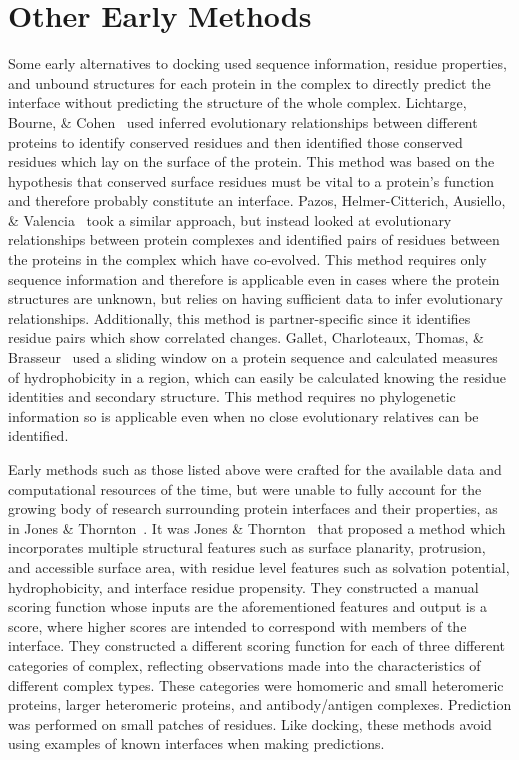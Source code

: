 \section{Other Early Methods}

Some early alternatives to docking used sequence information, residue properties, and unbound structures for each protein in the complex to directly predict the interface without predicting the structure of the whole complex.
Lichtarge, Bourne, \& Cohen~\cite{lichtarge1996} used inferred evolutionary relationships between different proteins to identify conserved residues and then identified those conserved residues which lay on the surface of the protein.
This method was based on the hypothesis that conserved surface residues must be vital to a protein's function and therefore probably constitute an interface.
Pazos, Helmer-Citterich, Ausiello, \& Valencia~\cite{pazos1997} took a similar approach, but instead looked at evolutionary relationships between protein complexes and identified pairs of residues between the proteins in the complex which have co-evolved.
This method requires only sequence information and therefore is applicable even in cases where the protein structures are unknown, but relies on having sufficient data to infer evolutionary relationships.
Additionally, this method is partner-specific since it identifies residue pairs which show correlated changes.
Gallet, Charloteaux, Thomas, \& Brasseur~\cite{gallet2000} used a sliding window on a protein sequence and calculated measures of hydrophobicity in a region, which can easily be calculated knowing the residue identities and secondary structure.
This method requires no phylogenetic information so is applicable even when no close evolutionary relatives can be identified.

Early methods such as those listed above were crafted for the available data and computational resources of the time, but were unable to fully account for the growing body of research surrounding protein interfaces and their properties, as in Jones \& Thornton~\cite{jones1996}.
It was Jones \& Thornton~\cite{jones1997} that proposed a method which incorporates multiple structural features such as surface planarity, protrusion, and accessible surface area, with residue level features such as solvation potential, hydrophobicity, and interface residue propensity.
They constructed a manual scoring function whose inputs are the aforementioned features and output is a score, where higher scores are intended to correspond with members of the interface.
They constructed a different scoring function for each of three different categories of complex, reflecting observations made into the characteristics of different complex types.
These categories were homomeric and small heteromeric proteins, larger heteromeric proteins, and antibody/antigen complexes.
Prediction was performed on small patches of residues.
Like docking, these methods avoid using examples of known interfaces when making predictions.

